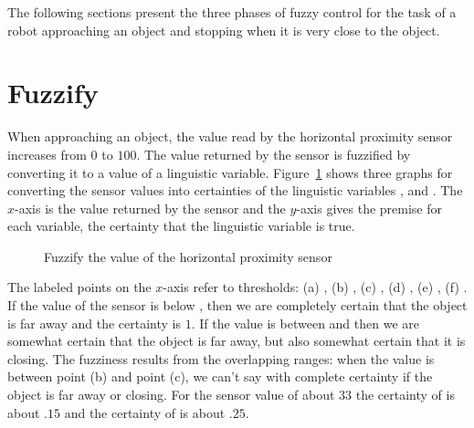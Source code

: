 The following sections present the three phases of fuzzy control for the task of a robot approaching an object and stopping when it is very close to the object.

\section{Fuzzify}

When approaching an object, the value read by the horizontal proximity sensor increases from $0$ to $100$. The value returned by the sensor is fuzzified by converting it to a value of a linguistic variable. Figure~\ref{fig.fuzz} shows three graphs for converting the sensor values into certainties of the linguistic variables ,  and . The $x$-axis is the value returned by the sensor and the $y$-axis gives the premise for each variable, the certainty that the linguistic variable is true.

\begin{figure}
\begin{center}
\caption{Fuzzify the value of the horizontal proximity sensor}\label{fig.fuzz}
\end{center}
\end{figure}

The labeled points on the $x$-axis refer to thresholds: (a) , (b) , (c) , (d) , (e) , (f) . If the value of the sensor is below , then we are completely certain that the object is far away and the certainty is $1$. If the value is between  and  then we are somewhat certain that the object is far away, but also somewhat certain that it is closing. The fuzziness results from the overlapping ranges: when the value is between point (b) and point (c), we can't say with complete certainty if the object is far away or closing. For the sensor value  of about $33$ the certainty of  is about $.15$ and the certainty of  is about $.25$.

